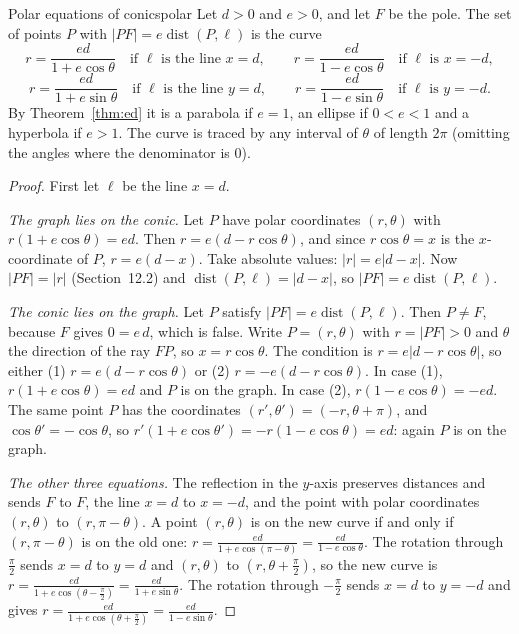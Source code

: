 \documentclass[11pt]{article}
\begin{document}
\begin{thm}{Polar equations of conics}{polar}
Let $d>0$ and $e>0$, and let $F$ be the pole. The set of points $P$ with $\lvert PF\rvert=e\operatorname{dist}(P,\ell)$ is the curve
\[
r=\frac{ed}{1+e\cos\theta}\quad\text{if }\ell\text{ is the line }x=d,\qquad r=\frac{ed}{1-e\cos\theta}\quad\text{if }\ell\text{ is }x=-d,
\]
\[
r=\frac{ed}{1+e\sin\theta}\quad\text{if }\ell\text{ is the line }y=d,\qquad r=\frac{ed}{1-e\sin\theta}\quad\text{if }\ell\text{ is }y=-d.
\]
By Theorem~\ref{thm:ed} it is a parabola if $e=1$, an ellipse if $0<e<1$ and a hyperbola if $e>1$. The curve is traced by any interval of $\theta$ of length $2\pi$ (omitting the angles where the denominator is $0$).
\end{thm}
\begin{proof}
First let $\ell$ be the line $x=d$.

\emph{The graph lies on the conic.} Let $P$ have polar coordinates $(r,\theta)$ with $r(1+e\cos\theta)=ed$. Then $r=e(d-r\cos\theta)$, and since $r\cos\theta=x$ is the $x$-coordinate of $P$, $r=e(d-x)$. Take absolute values: $\lvert r\rvert=e\lvert d-x\rvert$. Now $\lvert PF\rvert=\lvert r\rvert$ (Section~12.2) and $\operatorname{dist}(P,\ell)=\lvert d-x\rvert$, so $\lvert PF\rvert=e\operatorname{dist}(P,\ell)$.

\emph{The conic lies on the graph.} Let $P$ satisfy $\lvert PF\rvert=e\operatorname{dist}(P,\ell)$. Then $P\ne F$, because $F$ gives $0=e\,d$, which is false. Write $P=(r,\theta)$ with $r=\lvert PF\rvert>0$ and $\theta$ the direction of the ray $FP$, so $x=r\cos\theta$. The condition is $r=e\lvert d-r\cos\theta\rvert$, so either (1) $r=e(d-r\cos\theta)$ or (2) $r=-e(d-r\cos\theta)$. In case (1), $r(1+e\cos\theta)=ed$ and $P$ is on the graph. In case (2), $r(1-e\cos\theta)=-ed$. The same point $P$ has the coordinates $(r',\theta')=(-r,\theta+\pi)$, and $\cos\theta'=-\cos\theta$, so $r'(1+e\cos\theta')=-r(1-e\cos\theta)=ed$: again $P$ is on the graph.

\emph{The other three equations.} The reflection in the $y$-axis preserves distances and sends $F$ to $F$, the line $x=d$ to $x=-d$, and the point with polar coordinates $(r,\theta)$ to $(r,\pi-\theta)$. A point $(r,\theta)$ is on the new curve if and only if $(r,\pi-\theta)$ is on the old one: $r=\frac{ed}{1+e\cos(\pi-\theta)}=\frac{ed}{1-e\cos\theta}$. The rotation through $\frac\pi2$ sends $x=d$ to $y=d$ and $(r,\theta)$ to $\left(r,\theta+\frac\pi2\right)$, so the new curve is $r=\frac{ed}{1+e\cos\left(\theta-\frac\pi2\right)}=\frac{ed}{1+e\sin\theta}$. The rotation through $-\frac\pi2$ sends $x=d$ to $y=-d$ and gives $r=\frac{ed}{1+e\cos\left(\theta+\frac\pi2\right)}=\frac{ed}{1-e\sin\theta}$.
\end{proof}
\end{document}
